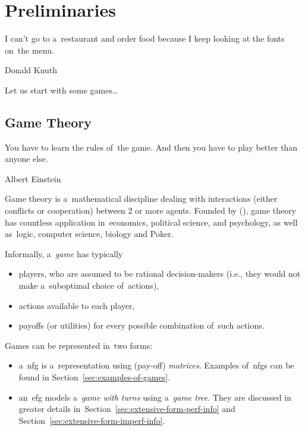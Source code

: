 \chapter{Preliminaries}
\epigraph{
  I can't go to a~restaurant and order food because I keep looking at the fonts on~the menu.
}{Donald Knuth}
Let us start with some games\ldots

\section{Game Theory}
\epigraph{
  You have to learn the rules of~the game.
  And then you have to play better than anyone else.
}{Albert Einstein}
Game theory is a~mathematical discipline dealing with interactions (either conflicts or cooperation) between $2$ or more agents.
Founded by (\cite{VonNeumann1953theory}), game theory has countless application in~economics, political science, and psychology, as well as~logic, computer science, biology and Poker.

Informally, a~\emph{game} has typically
\begin{itemize}
  \item players, who are assumed to be rational decision-makers (i.e., they would not make a~suboptimal choice of~actions),
  \item actions available to each player,
  \item payoffs (or utilities) for every possible combination of~such actions.
\end{itemize}

Games can be represented in~two forms:
\begin{itemize}
  \item a~\acrfull{nfg} is a~representation using (pay-off) \emph{matrices}.
    Examples of~\acrshort{nfg}s can be found in Section~\ref{sec:examples-of-games}.
  \item an~\acrfull{efg} models a~\emph{game with turns} using a~\emph{game tree}.
    They are discussed in greater details in~Section~\ref{sec:extensive-form-perf-info} and Section~\ref{sec:extensive-form-imperf-info}.
\end{itemize}

